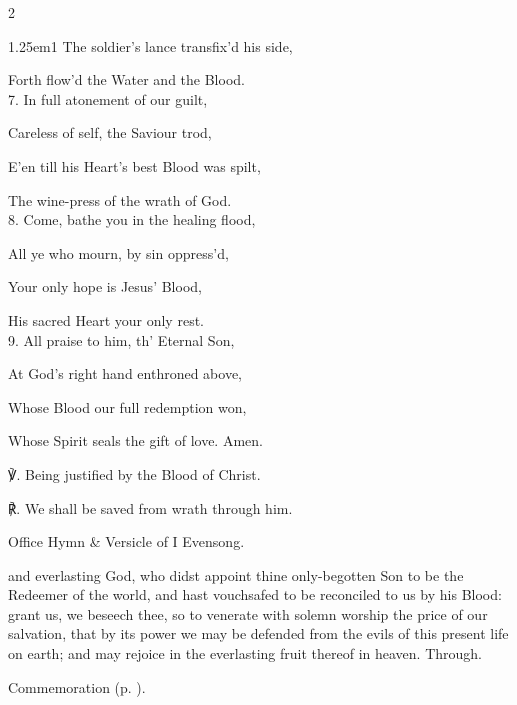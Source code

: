 \begin{paracol}{2}
\begin{hangparas}{1.25em}{1}
The soldier’s lance transfix'd his side,

Forth flow'd the Water and the Blood.\\

7. In full atonement of our guilt,

Careless of self, the Saviour trod,

E’en till his Heart’s best Blood was spilt,

The wine-press of the wrath of God.\\

8. Come, bathe you in the healing flood,

All ye who mourn, by sin oppress'd,

Your only hope is Jesus’ Blood,

His sacred Heart your only rest.\\

9. All praise to him, th' Eternal Son,

At God’s right hand enthroned above,

Whose Blood our full redemption won,

Whose Spirit seals the gift of love. Amen.\\
\end{hangparas}

℣. Being justified by the Blood of Christ.

℟. We shall be saved from wrath through him.


\fussy	
\end{paracol}

\secondEvensong
{}

\begin{rubric}
	Office Hymn \& Versicle of I Evensong.
\end{rubric}


\collect
{} and everlasting God, who didst appoint thine only-begotten Son to be the Redeemer of the world, and hast vouchsafed to be reconciled to us by his Blood: grant us, we beseech thee, so to venerate with solemn worship the price of our salvation, that by its power we may be defended from the evils of this present life on earth; and may rejoice in the everlasting fruit thereof in heaven. Through.
\begin{rubric}
    Commemoration  (p. \pageref{JohnBaptistCollect}).
\end{rubric}


